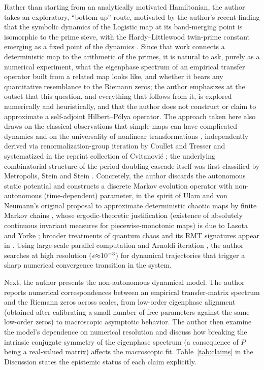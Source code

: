 \documentclass[mca,article,submit,oneauthor,pdftex]{Definitions/mdpi}
\begin{document}
Rather than starting from an analytically motivated Hamiltonian, the author takes an
exploratory, ``bottom-up'' route, motivated by the author's recent finding that the
symbolic dynamics of the Logistic map at its band-merging point is
isomorphic to the prime sieve, with the Hardy--Littlewood twin-prime
constant emerging as a fixed point of the dynamics \cite{wang2026}. Since
that work connects a deterministic map to the arithmetic of the primes, it
is natural to ask, purely as a numerical experiment, what the eigenphase
spectrum of an empirical transfer operator built from a related map looks
like, and whether it bears any quantitative resemblance to the Riemann
zeros; the author emphasizes at the outset that this question, and everything that
follows from it, is explored numerically and heuristically, and that the author does
not construct or claim to approximate a self-adjoint Hilbert--P\'olya
operator. The approach taken here also
draws on the classical observations that simple maps can have complicated
dynamics \cite{may1976,liyorke1975} and on the universality of nonlinear transformations
\cite{feigenbaum1978}, independently derived via renormalization-group
iteration by Coullet and Tresser \cite{coullettresser1978} and
systematized in the reprint collection of Cvitanovi\'c
\cite{cvitanovic1984}; the underlying combinatorial structure of the
period-doubling cascade itself was first classified by Metropolis, Stein
and Stein \cite{metropolis1973}. Concretely, the author discards the autonomous static potential
and constructs a discrete Markov evolution operator with non-autonomous
(time-dependent) parameter, in the spirit of Ulam and von Neumann's original
proposal to approximate deterministic chaotic maps by finite Markov chains
\cite{ulam1947,ulam1960}, whose ergodic-theoretic justification (existence of
absolutely continuous invariant measures for piecewise-monotonic maps) is due
to Lasota and Yorke \cite{lasotayorke1973}; broader treatments of quantum
chaos and its RMT signatures appear in \cite{gutzwiller1990,casati1995}. Using large-scale parallel computation and
Arnoldi iteration \cite{arpack1998}, the author searches at high resolution
(\(\text{\ensuremath{\epsilon}\ensuremath{\approx}}\text{10}^{\text{\ensuremath{-}3}}\)) for dynamical trajectories that
trigger a sharp numerical convergence transition in the system.

Next, the author presents the non-autonomous dynamical model. The author reports numerical
correspondences between an empirical transfer-matrix spectrum and the
Riemann zeros across scales, from low-order eigenphase alignment (obtained
after calibrating a small number of free parameters against the same
low-order zeros) to macroscopic asymptotic behavior. The author then examine the
model's dependence on numerical resolution and discuss how breaking the
intrinsic conjugate symmetry of the eigenphase spectrum (a consequence of
$P$ being a real-valued matrix) affects the
macroscopic fit. Table~\ref{tab:claims} in the Discussion states the
epistemic status of each claim explicitly.
\end{document}
